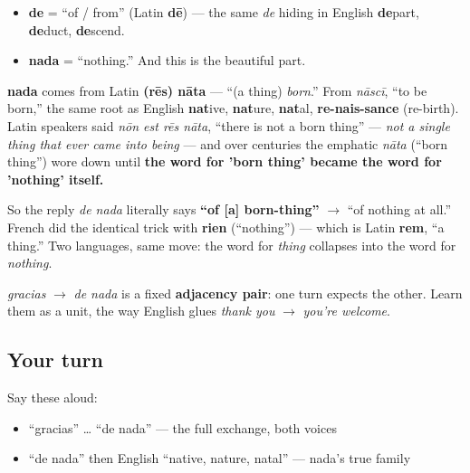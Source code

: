\begin{cousinweb}
\begin{itemize}
\raggedright
  \item \textbf{de} = \textquotedblleft{}of / from\textquotedblright{} (Latin \textbf{dē}) — the same \emph{de} hiding in English \textbf{de}part, \textbf{de}duct, \textbf{de}scend.
  \item \textbf{nada} = \textquotedblleft{}nothing.\textquotedblright{} And this is the beautiful part.
\end{itemize}

\textbf{nada} comes from Latin \textbf{(rēs) nāta} — \textquotedblleft{}(a thing) \emph{born}.\textquotedblright{} From \emph{nāscī}, \textquotedblleft{}to be born,\textquotedblright{} the same root as English \textbf{nat}ive, \textbf{nat}ure, \textbf{nat}al, \textbf{re-nais-sance} (re-birth). Latin speakers said \emph{nōn est rēs nāta}, \textquotedblleft{}there is not a born thing\textquotedblright{} — \emph{not a single thing that ever came into being} — and over centuries the emphatic \emph{nāta} (\textquotedblleft{}born thing\textquotedblright{}) wore down until \textbf{the word for 'born thing' became the word for 'nothing' itself.}

So the reply \emph{de nada} literally says \textbf{\textquotedblleft{}of {[}a{]} born-thing\textquotedblright{}} $\to$ \textquotedblleft{}of nothing at all.\textquotedblright{} French did the identical trick with \textbf{rien} (\textquotedblleft{}nothing\textquotedblright{}) — which is Latin \textbf{rem}, \textquotedblleft{}a thing.\textquotedblright{} Two languages, same move: the word for \emph{thing} collapses into the word for \emph{nothing}.
\end{cousinweb}

\begin{grammarlens}[title={Grammar Lens: the courtesy pair}]
\emph{gracias} $\to$ \emph{de nada} is a fixed \textbf{adjacency pair}: one turn expects the other. Learn them as a unit, the way English glues \emph{thank you} $\to$ \emph{you're welcome}.
\end{grammarlens}

\subsection*{Your turn}
Say these aloud:

\begin{itemize}
\raggedright
  \item \textquotedblleft{}gracias\textquotedblright{} … \textquotedblleft{}de nada\textquotedblright{} — the full exchange, both voices
  \item \textquotedblleft{}de nada\textquotedblright{} then English \textquotedblleft{}native, nature, natal\textquotedblright{} — nada's true family
\end{itemize}

